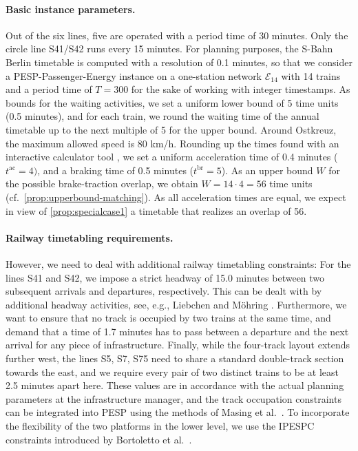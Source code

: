 \documentclass[11pt,a4paper]{article}
\newcommand{\ac}{\mathrm{ac}}
\newcommand{\br}{\mathrm{br}}
\newcommand{\pesppassenergy}{PESP-Passenger-Energy\xspace}
\theoremstyle{definition}
\theoremstyle{remark}
\begin{document}
\paragraph{Basic instance parameters.}
Out of the six lines, five are operated with a period time of 30 minutes. Only the circle line S41/S42 runs every 15 minutes. For planning purposes, the S-Bahn Berlin timetable is computed with a resolution of 0.1 minutes, so that we consider a \pesppassenergy instance on a one-station network $\mathcal E_{14}$ with 14 trains and a period time of $T = 300$ for the sake of working with integer timestamps. As bounds for the waiting activities, we set a uniform lower bound of 5 time units (0.5 minutes), and for each train, we round the waiting time of the annual timetable up to the next multiple of 5 for the upper bound.
Around Ostkreuz, the maximum allowed speed is 80 km/h. Rounding up the times found with an interactive calculator tool \cite{golling_bahntechnik}, we set a uniform acceleration time of 0.4 minutes ($t^\ac = 4)$, and a braking time of 0.5 minutes ($t^\br = 5$). As an upper bound $W$ for the possible brake-traction overlap, we obtain $W = 14 \cdot 4 = 56$ time units (cf.\ \cref{prop:upperbound-matching}). As all acceleration times are equal, we expect in view of \cref{prop:specialcase1} a timetable that realizes an overlap of 56.

\paragraph{Railway timetabling requirements.}
However, we need to deal with additional railway timetabling constraints: For the lines S41 and S42, we impose a strict headway of 15.0 minutes between two subsequent arrivals and departures, respectively. This can be dealt with by additional headway activities, see, e.g., Liebchen and Möhring \cite{liebchen_modeling_2007}. Furthermore, we want to ensure that no track is occupied by two trains at the same time, and demand that a time of 1.7 minutes has to pass between a departure and the next arrival for any piece of infrastructure. Finally, while the four-track layout extends further west, the lines S5, S7, S75 need to share a standard double-track section towards the east, and we require every pair of two distinct trains to be at least 2.5 minutes apart here. These values are in accordance with the actual planning parameters at the infrastructure manager, and the track occupation constraints can be integrated into PESP using the methods of Masing et al.~\cite{masing_periodic_2023}. To incorporate the flexibility of the two platforms in the lower level, we use the IPESPC constraints introduced by Bortoletto et al.~\cite{bortoletto_periodic_2024}.
\end{document}
